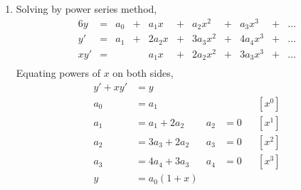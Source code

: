 \begin{enumerate}
    \item Solving by power series method,
          \begin{alignat}{6}
              y     & ={}      & a_0   & {}+{}    & a_1 x  &
              {}+{} & a_2 x^2  & {}+{} & a_3x^3   & {}+{}  & \dots \\
              y'    & ={}      & a_1   & {}+{}    & 2a_2 x &
              {}+{} & 3a_3 x^2 & {}+{} & 4a_4 x^3 & {}+{}  & \dots \\
              xy'   & ={}      &       &          & a_1 x  &
              {}+{} & 2a_2 x^2 & {}+{} & 3a_3 x^3 & {}+{}  & \dots \\
          \end{alignat}
          Equating powers of $ x $ on both sides,
          \begin{align}
              y' + xy' & = y                                  \\
              a_0      & = a_1         &     &     &  & [x^0] \\
              a_1      & = a_1 + 2a_2  & a_2 & = 0 &  & [x^1] \\
              a_2      & = 3a_3 + 2a_2 & a_3 & = 0 &  & [x^2] \\
              a_3      & = 4a_4 + 3a_3 & a_4 & = 0 &  & [x^3] \\
              y        & = a_0(1 + x)
          \end{align}


\end{enumerate}
